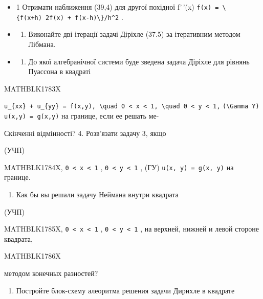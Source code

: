 \documentclass[
  ukrainian,
]{article}
\providecommand{\tightlist}{%
  \setlength{\itemsep}{0pt}\setlength{\parskip}{0pt}}
\begin{document}
\begin{itemize}
\tightlist
\item
  1 Отримати наближення (39,4) для другої похідної f'\,'(x)
  \texttt{f\textquotesingle{}\textquotesingle{}(x)\ =\ \textbackslash{}\{f(x+h)\ 2f(x)\ +\ f(x-h)\textbackslash{}\}/h\^{}2}
  .
\item
  \begin{enumerate}
  \def\labelenumi{\arabic{enumi}.}
  \setcounter{enumi}{1}
  \tightlist
  \item
    Виконайте дві ітерації задачі Діріхле (37.5) за ітеративним методом
    Лібмана.
  \end{enumerate}
\item
  \begin{enumerate}
  \def\labelenumi{\arabic{enumi}.}
  \setcounter{enumi}{2}
  \tightlist
  \item
    До якої алгебранічної системи буде зведена задача Діріхле для
    рівнянь Пуассона в квадраті
  \end{enumerate}
\end{itemize}

MATHBLK1783X

\texttt{u\_\{xx\}\ +\ u\_\{yy\}\ =\ f(x,y),\ \textbackslash{}quad\ 0\ \textless{}\ x\ \textless{}\ 1,\ \textbackslash{}quad\ 0\ \textless{}\ y\ \textless{}\ 1,}
\texttt{(\textbackslash{}Gamma\ Y)} \texttt{u(x,y)\ =\ g(x,y)} на
границе, если ее решать ме-

Скінченні відмінності? 4. Розв'язати задачу 3, якщо

(УЧП)

MATHBLK1784X, \texttt{0\ \textless{}\ x\ \textless{}\ 1} ,
\texttt{0\ \textless{}\ y\ \textless{}\ 1} , (ГУ)
\texttt{u(x,\ y)\ =\ g(x,\ y)} на границе.

\begin{enumerate}
\def\labelenumi{\arabic{enumi}.}
\setcounter{enumi}{4}
\tightlist
\item
  Как бы вы решали задачу Неймана внутри квадрата
\end{enumerate}

(УЧП)

MATHBLK1785X, \texttt{0\ \textless{}\ x\ \textless{}\ 1} ,
\texttt{0\ \textless{}\ y\ \textless{}\ 1} , на верхней, нижней и левой
стороне квадрата,

MATHBLK1786X

методом конечных разностей?

\begin{enumerate}
\def\labelenumi{\arabic{enumi}.}
\setcounter{enumi}{5}
\tightlist
\item
  Постройте блок-схему алеоритма решения задачи Дирихле в квадрате
\end{enumerate}
\end{document}
